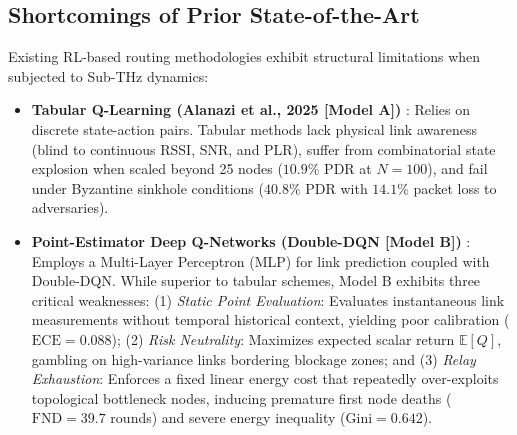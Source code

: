 \documentclass[conference]{IEEEtran}
\begin{document}
\subsection{Shortcomings of Prior State-of-the-Art}
Existing RL-based routing methodologies exhibit structural limitations when subjected to Sub-THz dynamics:
\begin{itemize}
    \item \textbf{Tabular Q-Learning (Alanazi et al., 2025 [Model A])} \cite{alanazi2025tabular}: Relies on discrete state-action pairs. Tabular methods lack physical link awareness (blind to continuous RSSI, SNR, and PLR), suffer from combinatorial state explosion when scaled beyond 25 nodes ($10.9\%$ PDR at $N=100$), and fail under Byzantine sinkhole conditions ($40.8\%$ PDR with $14.1\%$ packet loss to adversaries).
    \item \textbf{Point-Estimator Deep Q-Networks (Double-DQN [Model B])} \cite{liu2025riskaware, rahul2026dqn}: Employs a Multi-Layer Perceptron (MLP) for link prediction coupled with Double-DQN. While superior to tabular schemes, Model B exhibits three critical weaknesses: (1) \textit{Static Point Evaluation}: Evaluates instantaneous link measurements without temporal historical context, yielding poor calibration ($\text{ECE} = 0.088$); (2) \textit{Risk Neutrality}: Maximizes expected scalar return $\mathbb{E}[Q]$, gambling on high-variance links bordering blockage zones; and (3) \textit{Relay Exhaustion}: Enforces a fixed linear energy cost that repeatedly over-exploits topological bottleneck nodes, inducing premature first node deaths ($\text{FND} = 39.7$ rounds) and severe energy inequality ($\text{Gini} = 0.642$).
\end{itemize}
\end{document}
